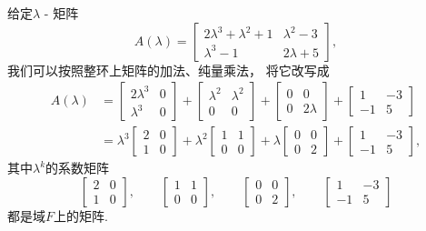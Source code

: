 \begin{example}
给定\(\lambda\) - 矩阵\[
	A(\lambda) = \begin{bmatrix}
		2 \lambda^3 + \lambda^2 + 1 & \lambda^2 - 3 \\
		\lambda^3 - 1 & 2 \lambda + 5
	\end{bmatrix},
\]
我们可以按照整环上矩阵的加法、纯量乘法，
将它改写成\begin{align*}
	A(\lambda)
	&= \begin{bmatrix}
		2 \lambda^3 & 0 \\
		\lambda^3 & 0
	\end{bmatrix}
	+ \begin{bmatrix}
		\lambda^2 & \lambda^2 \\
		0 & 0
	\end{bmatrix}
	+ \begin{bmatrix}
		0 & 0 \\
		0 & 2 \lambda
	\end{bmatrix}
	+ \begin{bmatrix}
		1 & -3 \\
		-1 & 5
	\end{bmatrix} \\
	&= \lambda^3
	\begin{bmatrix}
		2 & 0 \\
		1 & 0
	\end{bmatrix}
	+ \lambda^2
	\begin{bmatrix}
		1 & 1 \\
		0 & 0
	\end{bmatrix}
	+ \lambda
	\begin{bmatrix}
		0 & 0 \\
		0 & 2
	\end{bmatrix}
	+ \begin{bmatrix}
		1 & -3 \\
		-1 & 5
	\end{bmatrix},
\end{align*}
其中\(\lambda^k\)的系数矩阵\[
	\begin{bmatrix}
		2 & 0 \\
		1 & 0
	\end{bmatrix},
	\qquad
	\begin{bmatrix}
		1 & 1 \\
		0 & 0
	\end{bmatrix},
	\qquad
	\begin{bmatrix}
		0 & 0 \\
		0 & 2
	\end{bmatrix},
	\qquad
	\begin{bmatrix}
		1 & -3 \\
		-1 & 5
	\end{bmatrix}
\]都是域\(F\)上的矩阵.
\end{example}


